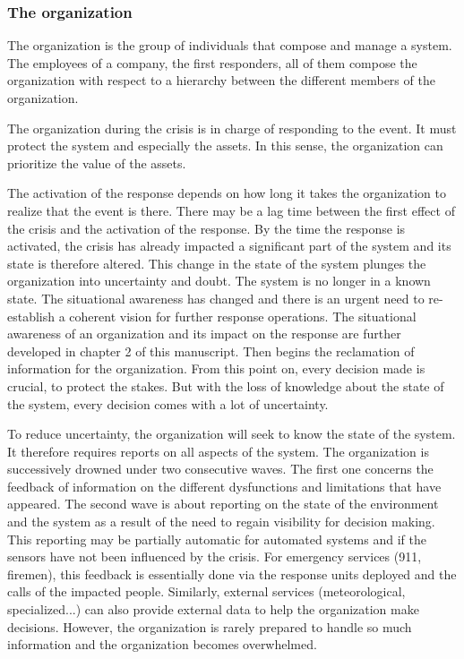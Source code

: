 \subsubsection{The organization}
The organization is the group of individuals that compose and manage a system.
The employees of a company, the first responders, all of them compose the organization with respect to a hierarchy between the different members of the organization.

The organization during the crisis is in charge of responding to the event.
It must protect the system and especially the assets.
In this sense, the organization can prioritize the value of the assets.

The activation of the response depends on how long it takes the organization to realize that the event is there.
There may be a lag time between the first effect of the crisis and the activation of the response.
By the time the response is activated, the crisis has already impacted a significant part of the system and its state is therefore altered.
This change in the state of the system plunges the organization into uncertainty and doubt.
The system is no longer in a known state.
The situational awareness has changed and there is an urgent need to re-establish a coherent vision for further response operations.
The situational awareness of an organization and its impact on the response are further developed in chapter 2 of this manuscript.
Then begins the reclamation of information for the organization.
From this point on, every decision made is crucial, to protect the stakes.
But with the loss of knowledge about the state of the system, every decision comes with a lot of uncertainty.

To reduce uncertainty, the organization will seek to know the state of the system.
It therefore requires reports on all aspects of the system.
The organization is successively drowned under two consecutive waves.
The first one concerns the feedback of information on the different dysfunctions and limitations that have appeared.
The second wave is about reporting on the state of the environment and the system as a result of the need to regain visibility for decision making.
This reporting may be partially automatic for automated systems and if the sensors have not been influenced by the crisis.
For emergency services (911, firemen), this feedback is essentially done via the response units deployed and the calls of the impacted people.
Similarly, external services (meteorological, specialized...) can also provide external data to help the organization make decisions.
However, the organization is rarely prepared to handle so much information and the organization becomes overwhelmed.

